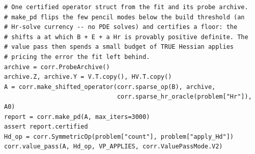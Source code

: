 \begin{verbatim}
# One certified operator struct from the fit and its probe archive.
# make_pd flips the few pencil modes below the build threshold (an
# Hr-solve currency -- no PDE solves) and certifies a floor: the
# shifts a at which B + E + a Hr is provably positive definite. The
# value pass then spends a small budget of TRUE Hessian applies
# pricing the error the fit left behind.
archive = corr.ProbeArchive()
archive.Z, archive.Y = V.T.copy(), HV.T.copy()
A = corr.make_shifted_operator(corr.sparse_op(B), archive,
                               corr.sparse_hr_oracle(problem["Hr"]), A0)
report = corr.make_pd(A, max_iters=3000)
assert report.certified
Hd_op = corr.SymmetricOp(problem["count"], problem["apply_Hd"])
corr.value_pass(A, Hd_op, VP_APPLIES, corr.ValuePassMode.V2)
\end{verbatim}
